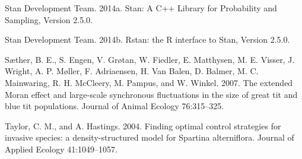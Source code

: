 \documentclass[12pt,]{article}
\begin{document}
Stan Development Team. 2014a. Stan: A C++ Library for Probability and
Sampling, Version 2.5.0.

Stan Development Team. 2014b. Rstan: the R interface to Stan, Version
2.5.0.

Sæther, B. E., S. Engen, V. Grøtan, W. Fiedler, E. Matthysen, M. E.
Visser, J. Wright, A. P. Møller, F. Adriaensen, H. {Van Balen}, D.
Balmer, M. C. Mainwaring, R. H. McCleery, M. Pampus, and W. Winkel.
2007. The extended Moran effect and large-scale synchronous fluctuations
in the size of great tit and blue tit populations. Journal of Animal
Ecology 76:315--325.

Taylor, C. M., and A. Hastings. 2004. Finding optimal control strategies
for invasive species: a density-structured model for Spartina
alterniflora. Journal of Applied Ecology 41:1049--1057.
\end{document}
